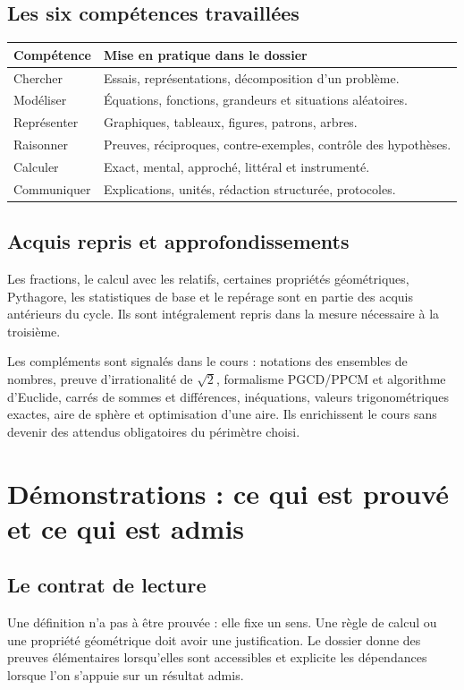 \documentclass[11pt,a4paper,oneside]{book}
\begin{document}
\section{Les six compétences travaillées}
\begin{center}
\begin{tabularx}{\textwidth}{lX}
\toprule Compétence & Mise en pratique dans le dossier\\\midrule
Chercher & Essais, représentations, décomposition d'un problème.\\
Modéliser & Équations, fonctions, grandeurs et situations aléatoires.\\
Représenter & Graphiques, tableaux, figures, patrons, arbres.\\
Raisonner & Preuves, réciproques, contre-exemples, contrôle des hypothèses.\\
Calculer & Exact, mental, approché, littéral et instrumenté.\\
Communiquer & Explications, unités, rédaction structurée, protocoles.\\\bottomrule
\end{tabularx}
\end{center}
\section{Acquis repris et approfondissements}
Les fractions, le calcul avec les relatifs, certaines propriétés géométriques, Pythagore, les statistiques de base et le repérage sont en partie des acquis antérieurs du cycle. Ils sont intégralement repris dans la mesure nécessaire à la troisième.

Les compléments sont signalés dans le cours : notations des ensembles de nombres, preuve d'irrationalité de $\sqrt2$, formalisme PGCD/PPCM et algorithme d'Euclide, carrés de sommes et différences, inéquations, valeurs trigonométriques exactes, aire de sphère et optimisation d'une aire. Ils enrichissent le cours sans devenir des attendus obligatoires du périmètre choisi.
\chapter{Démonstrations : ce qui est prouvé et ce qui est admis}
\section{Le contrat de lecture}
Une définition n'a pas à être prouvée : elle fixe un sens. Une règle de calcul ou une propriété géométrique doit avoir une justification. Le dossier donne des preuves élémentaires lorsqu'elles sont accessibles et explicite les dépendances lorsque l'on s'appuie sur un résultat admis.
\end{document}
